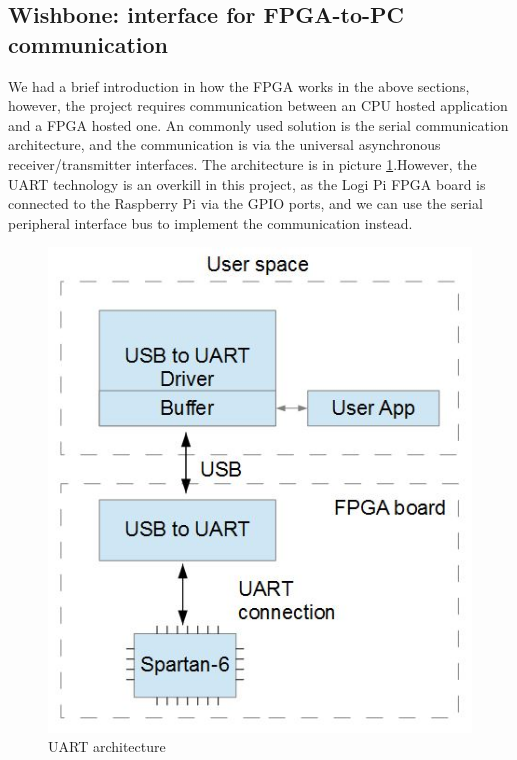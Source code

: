 \documentclass[11pt,openright,a4paper]{report}
\begin{document}
\subsection{Wishbone: interface for FPGA-to-PC communication}
We had a brief introduction in how the FPGA works in the above sections, however, the project requires communication between an CPU hosted application and a FPGA hosted one. An commonly used solution is the serial communication architecture, and the communication is via the universal asynchronous receiver/transmitter interfaces\cite{michael1992universal}. The architecture is in picture \ref{fig:uart}.However, the UART technology is an overkill in this project, as the Logi Pi FPGA board is connected to the Raspberry Pi via the GPIO ports, and we can use the serial peripheral interface bus to implement the communication instead.\\
\begin{figure}[H]
	\centering
	\includegraphics[width=0.4\linewidth]{picture/uart}
	\caption{UART architecture}
	\label{fig:uart}
\end{figure}
\end{document}
